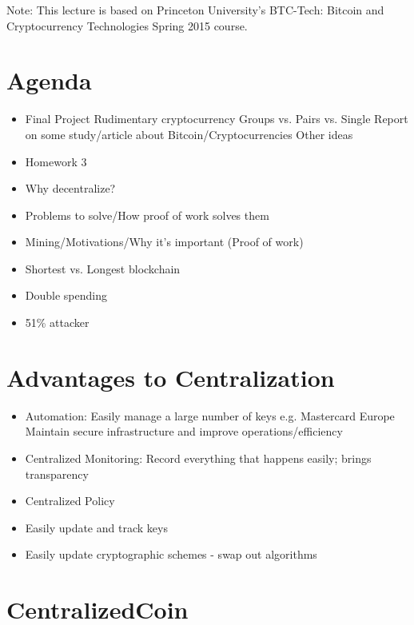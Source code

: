 \documentclass{article}
\begin{document}
\maketitle

Note: This lecture is based on Princeton University's BTC-Tech: Bitcoin and Cryptocurrency Technologies Spring 2015 course.

\section*{Agenda}
\begin{itemize}
  \item Final Project
    \subitem Rudimentary cryptocurrency
    \subitem Groups vs. Pairs vs. Single
    \subitem Report on some study/article about Bitcoin/Cryptocurrencies
    \subitem Other ideas
  \item Homework 3
  \item Why decentralize?
  \item Problems to solve/How proof of work solves them
  \item Mining/Motivations/Why it's important (Proof of work)
  \item Shortest vs. Longest blockchain
  \item Double spending
  \item 51\% attacker
\end{itemize}

\section*{Advantages to Centralization}
\begin{itemize}
  \item Automation:
    \subitem Easily manage a large number of keys e.g. Mastercard Europe
    \subitem Maintain secure infrastructure and improve operations/efficiency
  \item Centralized Monitoring:
    \subitem Record everything that happens easily; brings transparency
  \item Centralized Policy
  \item Easily update and track keys
  \item Easily update cryptographic schemes - swap out algorithms
\end{itemize}

\section*{CentralizedCoin}
\end{document}
